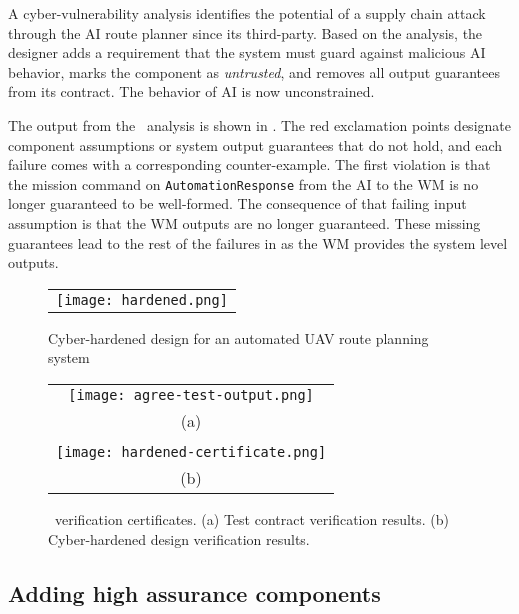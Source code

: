 A cyber-vulnerability analysis identifies the potential of a
supply chain attack through the AI route planner since its third-party.  Based on the analysis, the designer adds a requirement that the system must guard against malicious AI behavior, marks the component as \emph{untrusted}, and removes all output guarantees from its contract.  The behavior of AI is now unconstrained. 

The output from the \agr\ analysis is shown in .  The red
exclamation points designate component assumptions or system output
guarantees that do not hold, and each failure comes with a
corresponding counter-example.  The first violation is that the mission command on \texttt{AutomationResponse} from
the AI to the WM is no longer guaranteed to be well-formed.  The
consequence of that failing input assumption is that the WM outputs
are no longer guaranteed.  These
missing guarantees lead to the rest of the failures
in  as the WM provides the system
level outputs.

\begin{figure*}
  \begin{center}
    \begin{tabular}{c}
      \texttt{[image: hardened.png]}
    \end{tabular}
  \end{center}
  \caption{Cyber-hardened design for an automated UAV route planning system}
  \label{fig:hardened}
\end{figure*}

\begin{figure}
  \begin{center}
    \begin{tabular}{c}
      \texttt{[image: agree-test-output.png]} \\
      (a) \\ \\
      \texttt{[image: hardened-certificate.png]} \\
      (b)    
    \end{tabular}
  \end{center}
  \caption{\agr\ verification certificates. (a) Test contract verification results. (b) Cyber-hardened design verification results.}
  \label{fig:hardened-certificate}
\end{figure}

\subsection{Adding high assurance components}

